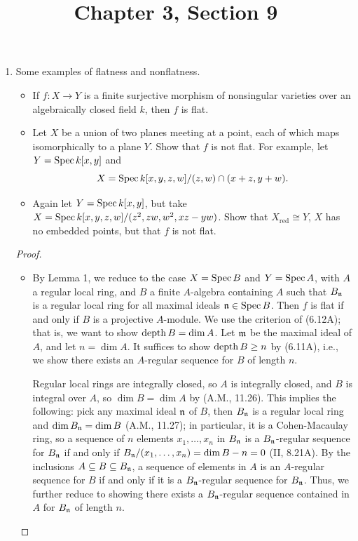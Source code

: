 \documentclass[a4paper]{article}
\title{Chapter 3, Section 9}
\begin{document}
\maketitle

\begin{enumerate} [label=\textbf{\arabic*.}, leftmargin=0em]

  \item[\textbf{3.}] Some examples of flatness and nonflatness.
        \begin{itemize}
          \item[(a)] If $f : X \to Y$ is a finite surjective morphism of nonsingular varieties over an algebraically closed field $k$, then $f$ is flat.
          \item[(b)] Let $X$ be a union of two planes meeting at a point, each of which maps isomorphically to a plane $Y$. Show that $f$ is not flat. For example, let $Y = \operatorname{Spec}{k[x, y]}$ and $$X = \operatorname{Spec}{k[x, y, z, w]} / (z, w) \cap (x + z, y + w).$$
          \item[(c)] Again let $Y = \operatorname{Spec}{k[x, y]}$, but take $X = \operatorname{Spec}{k[x, y, z, w] / (z^2, zw, w^2, xz - yw)}$. Show that $X_\text{red} \cong Y$, $X$ has no embedded points, but that $f$ is not flat.
        \end{itemize}

        \begin{proof} $ $ \vspace{0pt}
          \begin{itemize} [leftmargin=0cm]
            \item[(a)] By Lemma 1, we reduce to the case $X = \operatorname{Spec}{B}$ and $Y = \operatorname{Spec}{A}$, with $A$ a regular local ring, and $B$ a finite $A$-algebra containing $A$ such that $B_{\mathfrak{n}}$ is a regular local ring for all maximal ideals $\mathfrak{n} \in \operatorname{Spec}{B}$.
                  Then $f$ is flat if and only if $B$ is a projective $A$-module.
                  We use the criterion of (6.12A); that is, we want to show $\operatorname{depth}{B} = \dim{A}$.
                  Let $\mathfrak{m}$ be the maximal ideal of $A$, and let $n = \dim{A}$.
                  It suffices to show $\operatorname{depth}{B} \geq n$ by (6.11A), i.e., we show there exists an $A$-regular sequence for $B$ of length $n$.

                  Regular local rings are integrally closed, so $A$ is integrally closed, and $B$ is integral over $A$, so $\dim{B} = \dim{A}$ by (A.M., 11.26).
                  This implies the following: pick any maximal ideal $\mathfrak{n}$ of $B$, then $B_{\mathfrak{n}}$ is a regular local ring and $\dim{B_{\mathfrak{n}}} = \dim{B}$ (A.M., 11.27); in particular, it is a Cohen-Macaulay ring, so a sequence of $n$ elements $x_1, \dots, x_n$ in $B_{\mathfrak{n}}$ is a $B_{\mathfrak{n}}$-regular sequence for $B_{\mathfrak{n}}$ if and only if $B_{\mathfrak{n}}/(x_1, \dots, x_n) = \dim{B} - n = 0$ (II, 8.21A).
                  By the inclusions $A \subseteq B \subseteq B_{\mathfrak{n}}$, a sequence of elements in $A$ is an $A$-regular sequence for $B$ if and only if it is a $B_{\mathfrak{n}}$-regular sequence for $B_{\mathfrak{n}}$.
                  Thus, we further reduce to showing there exists a $B_{\mathfrak{n}}$-regular sequence contained in $A$ for $B_{\mathfrak{n}}$ of length $n$.


\end{itemize}
\end{proof}
\end{enumerate}
\end{document}
